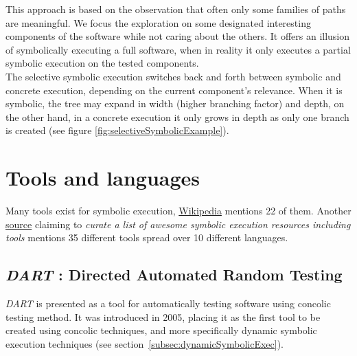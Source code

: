 \documentclass[11pt]{IEEEtran}
\begin{document}
    		This approach is based on the observation that often only some families of paths are meaningful\cite{chipounov2012s2e}. We focus the exploration on some designated interesting components of the software while not caring about the others. It offers an illusion of symbolically executing a full software, when in reality it only executes a partial symbolic execution on the tested components.\\

    		The selective symbolic execution switches back and forth between symbolic and concrete execution, depending on the current component's relevance. When it is symbolic, the tree may expand in width (higher branching factor) and depth, on the other hand, in a concrete execution it only grows in depth as only one branch is created (see figure \ref{fig:selectiveSymbolicExample}).
    		

  \section{Tools and languages}
  	Many tools exist for symbolic execution, \href{https://en.wikipedia.org/wiki/Symbolic_execution\#Tools}{Wikipedia} mentions 22 of them. Another \href{https://github.com/ksluckow/awesome-symbolic-execution\#tools}{source} claiming to \emph{curate a list of awesome symbolic execution resources including tools} mentions 35 different tools spread over 10 different languages.\\

    \subsection{\emph{DART} : Directed Automated Random Testing}
    \label{subsec:DART}
    	\emph{DART} is presented as a tool for automatically testing software using concolic testing method. It was introduced in 2005, placing it as the first tool to be created using concolic techniques, and more specifically dynamic symbolic execution techniques (see section~\ref{subsec:dynamicSymbolicExec}). \\
\end{document}
